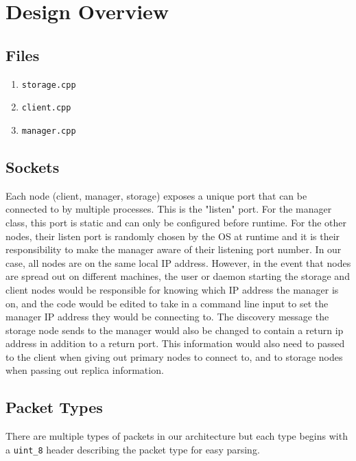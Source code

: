 \documentclass{article}
\begin{document}
\section{Design Overview}
\subsection{Files}
\begin{enumerate}
    \item \texttt{storage.cpp}
    \item \texttt{client.cpp}
    \item \texttt{manager.cpp}
\end{enumerate}

\subsection{Sockets}
Each node (client, manager, storage) exposes a unique port that can be connected to by multiple processes.
This is the "listen" port. For the manager class, this port is static and can only be configured before runtime.
For the other nodes, their listen port is randomly chosen by the OS at runtime and it is their responsibility to make the manager aware of their listening port number.
In our case, all nodes are on the same local IP address. However, in the event that nodes are spread out on different machines, the user or daemon starting the storage and client
nodes would be responsible for knowing which IP address the manager is on, and the code would be edited to take in a command line input to set the manager IP address
they would be connecting to. The discovery message the storage node sends to the manager would also be changed to contain a return ip address in addition to a return port.
This information would also need to passed to the client when giving out primary nodes to connect to, and to storage nodes when passing out replica information.


\subsection{Packet Types}
There are multiple types of packets in our architecture but each type begins with a \texttt{uint\_8} header describing the packet type for easy parsing.
\end{document}
